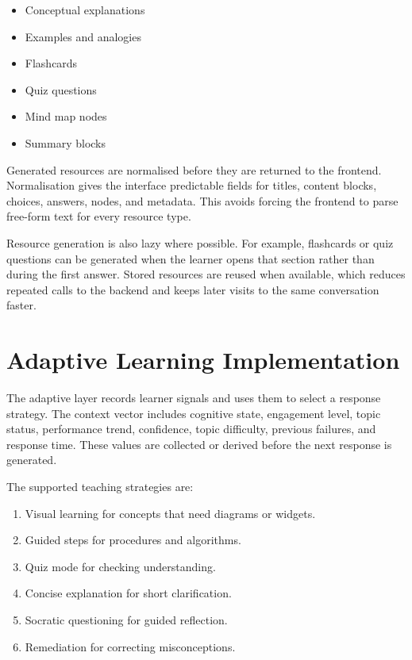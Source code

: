 \begin{itemize}[leftmargin=1.2cm]
	\item Conceptual explanations
	\item Examples and analogies
	\item Flashcards
	\item Quiz questions
	\item Mind map nodes
	\item Summary blocks
\end{itemize}

Generated resources are normalised before they are returned to the frontend. Normalisation gives the interface predictable fields for titles, content blocks, choices, answers, nodes, and metadata. This avoids forcing the frontend to parse free-form text for every resource type.

Resource generation is also lazy where possible. For example, flashcards or quiz questions can be generated when the learner opens that section rather than during the first answer. Stored resources are reused when available, which reduces repeated calls to the backend and keeps later visits to the same conversation faster.

\section[Adaptive Learning Implementation]{\textbf{Adaptive Learning Implementation}}
The adaptive layer records learner signals and uses them to select a response strategy. The context vector includes cognitive state, engagement level, topic status, performance trend, confidence, topic difficulty, previous failures, and response time. These values are collected or derived before the next response is generated.

The supported teaching strategies are:
\begin{enumerate}[leftmargin=1.2cm]
	\item Visual learning for concepts that need diagrams or widgets.
	\item Guided steps for procedures and algorithms.
	\item Quiz mode for checking understanding.
	\item Concise explanation for short clarification.
	\item Socratic questioning for guided reflection.
	\item Remediation for correcting misconceptions.
\end{enumerate}

